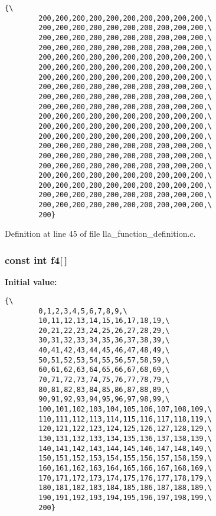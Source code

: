 \footnotesize\begin{verbatim}{\
        200,200,200,200,200,200,200,200,200,200,\
        200,200,200,200,200,200,200,200,200,200,\
        200,200,200,200,200,200,200,200,200,200,\
        200,200,200,200,200,200,200,200,200,200,\
        200,200,200,200,200,200,200,200,200,200,\
        200,200,200,200,200,200,200,200,200,200,\
        200,200,200,200,200,200,200,200,200,200,\
        200,200,200,200,200,200,200,200,200,200,\
        200,200,200,200,200,200,200,200,200,200,\
        200,200,200,200,200,200,200,200,200,200,\
        200,200,200,200,200,200,200,200,200,200,\
        200,200,200,200,200,200,200,200,200,200,\
        200,200,200,200,200,200,200,200,200,200,\
        200,200,200,200,200,200,200,200,200,200,\
        200,200,200,200,200,200,200,200,200,200,\
        200,200,200,200,200,200,200,200,200,200,\
        200,200,200,200,200,200,200,200,200,200,\
        200,200,200,200,200,200,200,200,200,200,\
        200,200,200,200,200,200,200,200,200,200,\
        200,200,200,200,200,200,200,200,200,200,\
        200}
\end{verbatim}\normalsize 


Definition at line 45 of file lla\_\-function\_\-definition.c.
\subsubsection{\setlength{\rightskip}{0pt plus 5cm}const int {\bf f4}[$\,$]}\label{lla__function__definition_8c_a3}


{\bf Initial value:}

\footnotesize\begin{verbatim}{\
        0,1,2,3,4,5,6,7,8,9,\
        10,11,12,13,14,15,16,17,18,19,\
        20,21,22,23,24,25,26,27,28,29,\
        30,31,32,33,34,35,36,37,38,39,\
        40,41,42,43,44,45,46,47,48,49,\
        50,51,52,53,54,55,56,57,58,59,\
        60,61,62,63,64,65,66,67,68,69,\
        70,71,72,73,74,75,76,77,78,79,\
        80,81,82,83,84,85,86,87,88,89,\
        90,91,92,93,94,95,96,97,98,99,\
        100,101,102,103,104,105,106,107,108,109,\
        110,111,112,113,114,115,116,117,118,119,\
        120,121,122,123,124,125,126,127,128,129,\
        130,131,132,133,134,135,136,137,138,139,\
        140,141,142,143,144,145,146,147,148,149,\
        150,151,152,153,154,155,156,157,158,159,\
        160,161,162,163,164,165,166,167,168,169,\
        170,171,172,173,174,175,176,177,178,179,\
        180,181,182,183,184,185,186,187,188,189,\
        190,191,192,193,194,195,196,197,198,199,\
        200}
\end{verbatim}\normalsize 


